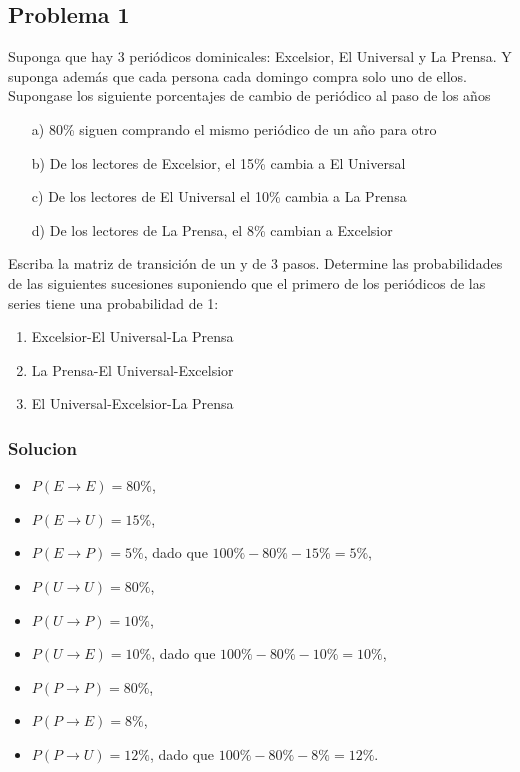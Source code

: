 \documentclass{article}
\begin{document}
\subsection*{Problema 1}

Suponga que hay 3 periódicos dominicales: Excelsior, El Universal y La Prensa.
Y suponga además que cada persona cada domingo compra solo uno de ellos. Supongase los siguiente porcentajes de cambio de periódico al paso de los años

\begin{itemize}
    \item[a)] 80\% siguen comprando el mismo periódico de un año para otro
    \item[b)] De los lectores de Excelsior, el 15\% cambia a El Universal
    \item[c)] De los lectores de El Universal el 10\% cambia a La Prensa
    \item[d)] De los lectores de La Prensa, el 8\% cambian a Excelsior
\end{itemize}

Escriba la matriz de transición de un y de 3 pasos. Determine las probabilidades de las siguientes sucesiones suponiendo que el primero de los periódicos de las series tiene una probabilidad de 1:

\begin{enumerate}
    \item Excelsior-El Universal-La Prensa
    \item La Prensa-El Universal-Excelsior
    \item El Universal-Excelsior-La Prensa
\end{enumerate}

\subsubsection*{Solucion}

\begin{itemize}
    \item $P(E \rightarrow E) = 80\%$,
    \item $P(E \rightarrow U) = 15\%$,
    \item $P(E \rightarrow P) = 5\%$, dado que $100\% - 80\% - 15\% = 5\%$,
    \item $P(U \rightarrow U) = 80\%$,
    \item $P(U \rightarrow P) = 10\%$,
    \item $P(U \rightarrow E) = 10\%$, dado que $100\% - 80\% - 10\% = 10\%$,
    \item $P(P \rightarrow P) = 80\%$,
    \item $P(P \rightarrow E) = 8\%$,
    \item $P(P \rightarrow U) = 12\%$, dado que $100\% - 80\% - 8\% = 12\%$.
\end{itemize}
\end{document}
